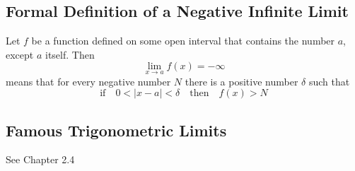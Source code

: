 \subsection*{Formal Definition of a Negative Infinite Limit}

Let \(f\) be a function defined on some open interval that contains the number \(a\), except \(a\) itself. Then
$$\lim_{x \to a}f(x)=-\infty$$
means that for every negative number \(N\) there is a positive number \(\delta\) such that 
$$\text{if} \quad 0< \left| x-a \right| <\delta \quad \text{then} \quad f(x)>N$$

\subsection*{Famous Trigonometric Limits}

See Chapter 2.4
